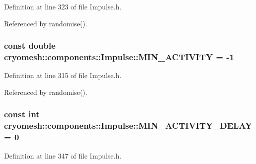 \-Definition at line 323 of file \-Impulse.\-h.



\-Referenced by randomise().

\hypertarget{classcryomesh_1_1components_1_1Impulse_a3cc162bae9213a65a6aa241b256e1a84}{
\subsubsection[{\-M\-I\-N\-\_\-\-A\-C\-T\-I\-V\-I\-T\-Y}]{\setlength{\rightskip}{0pt plus 5cm}const double {\bf cryomesh\-::components\-::\-Impulse\-::\-M\-I\-N\-\_\-\-A\-C\-T\-I\-V\-I\-T\-Y} = -\/1}}\label{classcryomesh_1_1components_1_1Impulse_a3cc162bae9213a65a6aa241b256e1a84}


\-Definition at line 315 of file \-Impulse.\-h.



\-Referenced by randomise().

\hypertarget{classcryomesh_1_1components_1_1Impulse_a7537a73569989ce84f0ab1b10e07ee94}{
\subsubsection[{\-M\-I\-N\-\_\-\-A\-C\-T\-I\-V\-I\-T\-Y\-\_\-\-D\-E\-L\-A\-Y}]{\setlength{\rightskip}{0pt plus 5cm}const int {\bf cryomesh\-::components\-::\-Impulse\-::\-M\-I\-N\-\_\-\-A\-C\-T\-I\-V\-I\-T\-Y\-\_\-\-D\-E\-L\-A\-Y} = 0}}\label{classcryomesh_1_1components_1_1Impulse_a7537a73569989ce84f0ab1b10e07ee94}


\-Definition at line 347 of file \-Impulse.\-h.



